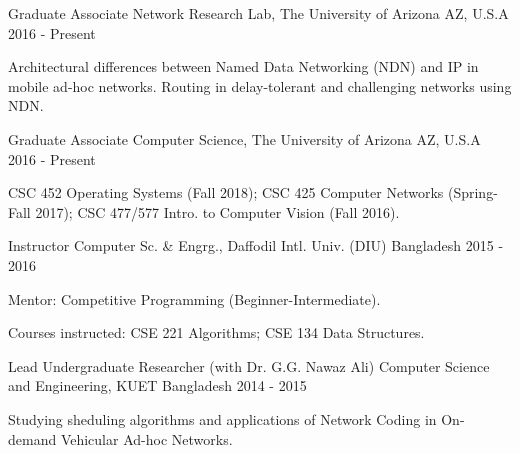 

\begin{cventries}

  \cventry
    {Graduate Associate} %
    {Network Research Lab, The University of Arizona} %
    {AZ, U.S.A} %
    {2016 - Present} %
    {
      \begin{cvitems} %
        \item {Architectural differences between Named Data Networking (NDN) and IP in mobile ad-hoc networks. Routing in delay-tolerant and challenging networks using NDN.}
      \end{cvitems}
    }
    {}

  \cventry
    {Graduate Associate} %
    {Computer Science, The University of Arizona} %
    {AZ, U.S.A} %
    {2016 - Present} %
    {
      \begin{cvitems} %
        \item {CSC 452 Operating Systems (Fall 2018); CSC 425 Computer Networks (Spring-Fall 2017); CSC 477/577 Intro. to Computer Vision (Fall 2016).}
      \end{cvitems}
    }
    {}

  \cventry
    {Instructor} %
    {Computer Sc. \& Engrg., Daffodil Intl. Univ. (DIU)} %
    {Bangladesh} %
    {2015 - 2016} %
    {
      \begin{cvitems} %
        \item {Mentor: Competitive Programming (Beginner-Intermediate).}
        \item {Courses instructed: CSE 221 Algorithms; CSE 134 Data Structures.}
      \end{cvitems}
    }
    {}

  \cventry
    {Lead Undergraduate Researcher (with Dr. G.G. Nawaz Ali)} %
    {Computer Science and Engineering, KUET} %
    {Bangladesh} %
    {2014 - 2015} %
    {
      \begin{cvitems} %
        \item {Studying sheduling algorithms and applications of Network Coding in On-demand Vehicular Ad-hoc Networks.}
      \end{cvitems}
    }
    {}


\end{cventries}
